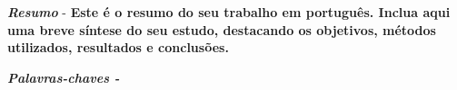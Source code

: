 
\textit{\textbf{Resumo}} - 
\textbf{Este é o resumo do seu trabalho em português. Inclua aqui uma breve síntese do seu estudo, destacando os objetivos, métodos utilizados, resultados e conclusões.}

\textit{\textbf{Palavras-chaves - 
\palavraschavespt}}